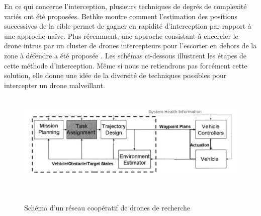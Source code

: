 \documentclass[12pt, openany]{article}
\begin{document}
En ce qui concerne l’interception, plusieurs techniques de degrés de complexité variés ont été proposées. Bethke \cite{4} montre comment l’estimation des positions successives de la cible permet de gagner en rapidité d’interception par rapport à une approche naïve. Plus récemment, une approche consistant à encercler le drone intrus par un cluster de drones intercepteurs pour l’escorter en dehors de la zone à défendre a été proposée \cite{5} . Les schémas ci-dessous illustrent les étapes de cette méthode d’interception. Même si nous ne retiendrons pas forcément cette solution, elle donne une idée de la diversité de techniques possibles pour intercepter un drone malveillant.
\clearpage
\begin{figure}[!h]
    \vspace{1cm}\\
    \centering
    \includegraphics[scale=0.7]{Schéma réseau de drones état de l'art proposition détaillée}
    \caption{Schéma d'un réseau coopératif de drones de recherche}
    \label{fig1}
    \vspace{1cm}\\
\end{figure}
\end{document}
